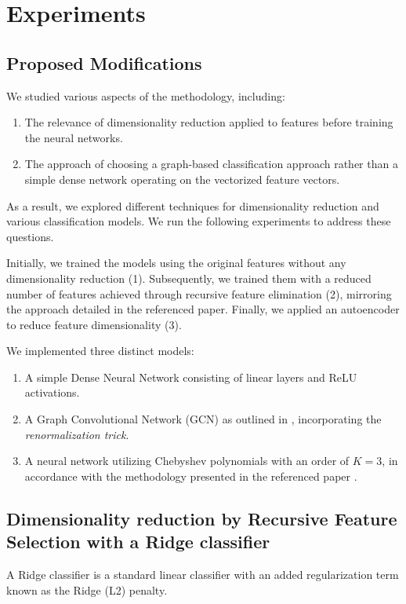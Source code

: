 \section{Experiments}

\subsection{Proposed Modifications}
We studied various aspects of the methodology, including:
\begin{enumerate}
    \item The relevance of dimensionality reduction applied to features before training the neural networks.
    \item The approach of choosing a graph-based classification approach rather than a simple dense network operating on the vectorized feature vectors.
\end{enumerate}
As a result, we explored different techniques for dimensionality reduction and various classification models. We run the following experiments to address these questions.

Initially, we trained the models using the original features without any dimensionality reduction (1). Subsequently, we trained them with a reduced number of features achieved through recursive feature elimination (2), mirroring the approach detailed in the referenced paper. Finally, we applied an autoencoder to reduce feature dimensionality (3).

We implemented three distinct models:
\begin{enumerate}
    \item A simple Dense Neural Network consisting of linear layers and ReLU activations.
    \item A Graph Convolutional Network (GCN) as outlined in \cite{kipf_semi-supervised_2017}, incorporating the \textit{renormalization trick}.
    \item A neural network utilizing Chebyshev polynomials with an order of $K=3$, in accordance with the methodology presented in the referenced paper \cite{Parisot17}.
\end{enumerate}


\subsection{Dimensionality reduction by Recursive Feature Selection with a Ridge classifier}

A Ridge classifier is a standard linear classifier with an added regularization term known as the Ridge (L2) penalty.

